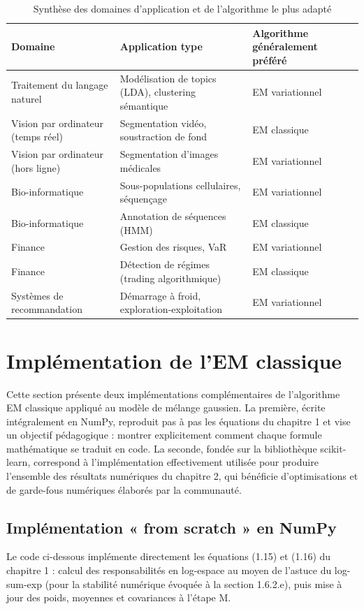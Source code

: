 \begin{table}[H]
\centering
\small
\setlength{\tabcolsep}{0.14cm}
\begin{tabular}{|p{4.84cm}|p{4.84cm}|p{4.84cm}|}
\hline
\textbf{Domaine} & \textbf{Application type} & \textbf{Algorithme généralement préféré} \\
\hline
Traitement du langage naturel & Modélisation de topics (LDA), clustering sémantique & EM variationnel \\
\hline
Vision par ordinateur (temps réel) & Segmentation vidéo, soustraction de fond & EM classique \\
\hline
Vision par ordinateur (hors ligne) & Segmentation d'images médicales & EM variationnel \\
\hline
Bio-informatique & Sous-populations cellulaires, séquençage & EM variationnel \\
\hline
Bio-informatique & Annotation de séquences (HMM) & EM classique \\
\hline
Finance & Gestion des risques, VaR & EM variationnel \\
\hline
Finance & Détection de régimes (trading algorithmique) & EM classique \\
\hline
Systèmes de recommandation & Démarrage à froid, exploration-exploitation & EM variationnel \\
\hline
\end{tabular}
\caption{Synthèse des domaines d'application et de l'algorithme le plus adapté}
\label{tab:3_1}
\end{table}
\section{Implémentation de l'EM classique}
Cette section présente deux implémentations complémentaires de l'algorithme EM classique appliqué au modèle de mélange gaussien. La première, écrite intégralement en NumPy, reproduit pas à pas les équations du chapitre 1 et vise un objectif pédagogique : montrer explicitement comment chaque formule mathématique se traduit en code. La seconde, fondée sur la bibliothèque scikit-learn, correspond à l'implémentation effectivement utilisée pour produire l'ensemble des résultats numériques du chapitre 2, qui bénéficie d'optimisations et de garde-fous numériques élaborés par la communauté.

\subsection{Implémentation « from scratch » en NumPy}
Le code ci-dessous implémente directement les équations (1.15) et (1.16) du chapitre 1 : calcul des responsabilités en log-espace au moyen de l'astuce du log-sum-exp (pour la stabilité numérique évoquée à la section 1.6.2.e), puis mise à jour des poids, moyennes et covariances à l'étape M.

